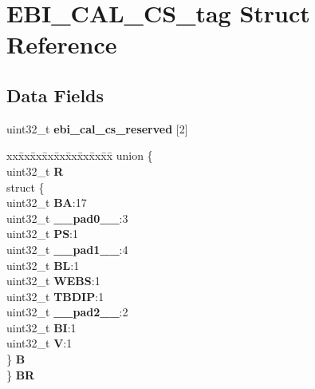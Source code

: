 \hypertarget{structEBI__CAL__CS__tag}{}\section{E\+B\+I\+\_\+\+C\+A\+L\+\_\+\+C\+S\+\_\+tag Struct Reference}
\label{structEBI__CAL__CS__tag}
\subsection*{Data Fields}
\begin{DoxyCompactItemize}
\item 
\mbox{\label{structEBI__CAL__CS__tag_a7d85a4102e1421d1ee55b295e8c58591}} 
uint32\+\_\+t {\bfseries ebi\+\_\+cal\+\_\+cs\+\_\+reserved} \mbox{[}2\mbox{]}
\item 
\mbox{\label{structEBI__CAL__CS__tag_a9eb805cd1edf50fa9dd0def01333c60d}} 
\begin{tabbing}
xx\=xx\=xx\=xx\=xx\=xx\=xx\=xx\=xx\=\kill
union \{\\
\>uint32\_t {\bfseries R}\\
\>struct \{\\
\>\>uint32\_t {\bfseries BA}:17\\
\>\>uint32\_t {\bfseries \_\_pad0\_\_}:3\\
\>\>uint32\_t {\bfseries PS}:1\\
\>\>uint32\_t {\bfseries \_\_pad1\_\_}:4\\
\>\>uint32\_t {\bfseries BL}:1\\
\>\>uint32\_t {\bfseries WEBS}:1\\
\>\>uint32\_t {\bfseries TBDIP}:1\\
\>\>uint32\_t {\bfseries \_\_pad2\_\_}:2\\
\>\>uint32\_t {\bfseries BI}:1\\
\>\>uint32\_t {\bfseries V}:1\\
\>\} {\bfseries B}\\
\} {\bfseries BR}\\


\end{tabbing}
\end{DoxyCompactItemize}
